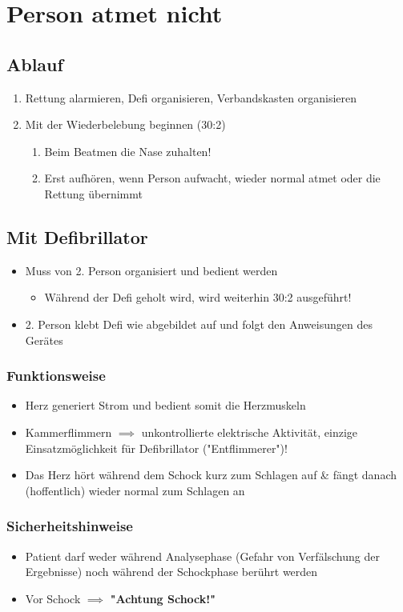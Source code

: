 \section{Person atmet nicht}
\subsection*{Ablauf}
\begin{enumerate}
    \item Rettung alarmieren, Defi organisieren, Verbandskasten organisieren
    \item Mit der Wiederbelebung beginnen (30:2)
    \begin{enumerate}
        \item Beim Beatmen die Nase zuhalten!
        \item Erst aufhören, wenn Person aufwacht, wieder normal atmet oder die Rettung übernimmt
    \end{enumerate}
\end{enumerate}

\subsection*{Mit Defibrillator}
\begin{itemize}
    \item Muss von 2. Person organisiert und bedient werden
    \begin{itemize}
        \item Während der Defi geholt wird, wird weiterhin 30:2 ausgeführt!
    \end{itemize}
    \item 2. Person klebt Defi wie abgebildet auf und folgt den Anweisungen des Gerätes
\end{itemize}
\subsubsection*{Funktionsweise}
\begin{itemize}
    \item Herz generiert Strom und bedient somit die Herzmuskeln
    \item Kammerflimmern $\implies$ unkontrollierte elektrische Aktivität, einzige Einsatzmöglichkeit für Defibrillator ("Entflimmerer")!
    \item Das Herz hört während dem Schock kurz zum Schlagen auf \& fängt danach (hoffentlich) wieder normal zum Schlagen an
\end{itemize}
\subsubsection*{Sicherheitshinweise}
\begin{itemize}
    \item Patient darf weder während Analysephase (Gefahr von Verfälschung der Ergebnisse) noch während der Schockphase berührt werden
    \item Vor Schock $\implies$ \textbf{"Achtung Schock!"}
\end{itemize}

